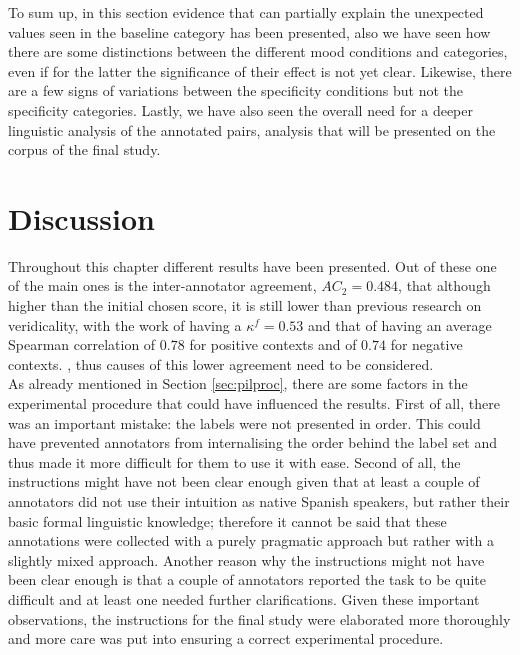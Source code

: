 To sum up, in this section evidence that can partially explain the unexpected values seen in the baseline category has been presented, also we have seen how there are some distinctions between the different mood conditions and categories, even if for the latter the significance of their effect is not yet clear. Likewise, there are a few signs of variations between the specificity conditions but not the specificity categories. Lastly, we have also seen the overall need for a deeper linguistic analysis of the annotated pairs, analysis that will be presented on the corpus of the final study.\\

\section{Discussion}
\label{sect:pildisc}
Throughout this chapter different results have been presented. Out of these one of the main ones is the inter-annotator agreement, $AC_2=0.484$, that although higher than the initial chosen score, it is still lower than previous research on veridicality, with the work of \citet{de2012did} having a $\kappa^f=0.53$ and that of \citet{ross2019well} having an average Spearman correlation of $0.78$ for positive contexts and of $0.74$ for negative contexts. , thus causes of this lower agreement need to be considered.\\

As already mentioned in Section \ref{sec:pilproc}, there are some factors in the experimental procedure that could have influenced the results. First of all, there was an important mistake: the labels were not presented in order. This could have prevented annotators from internalising the order behind the label set and thus made it more difficult for them to use it with ease. Second of all, the instructions might have not been clear enough given that at least a couple of annotators did not use their intuition as native Spanish speakers, but rather their basic formal linguistic knowledge; therefore it cannot be said that these annotations were collected with a purely pragmatic approach but rather with a slightly mixed approach. Another reason why the instructions might not have been clear enough is that a couple of annotators reported the task to be quite difficult and at least one needed further clarifications. Given these important observations, the instructions for the final study were elaborated more thoroughly and more care was put into ensuring a correct experimental procedure.\\


